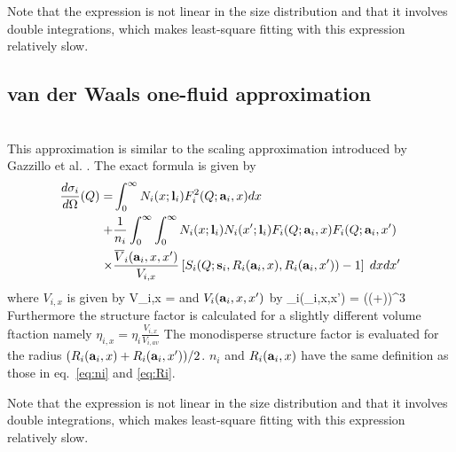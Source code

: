 Note that the expression is not linear in the size distribution
and that it involves double integrations, which makes least-square
fitting with this expression relatively slow.

\subsection{van der Waals one-fluid approximation}
\label{sec:SQvdW1}
~\\
This approximation is similar to the scaling approximation introduced by Gazzillo
et al. \cite{Gazzillo1999}. The exact formula is given by
\begin{align}
\frac{d\sigma_i}{d\Omega}(Q) =
 &\int_0^\infty N_i(x;\B{l}_i) F_i^2(Q;\B{a}_i,x) dx \\
+ & \frac{1}{n_i}\int_0^\infty\int_0^\infty
N_i(x;\B{l}_i) N_i(x';\B{l}_i) F_i(Q;\B{a}_i,x) F_i(Q;\B{a}_i,x') \nonumber \\
\times & \frac{\overline{V}_i(\B{a}_i,x,x')}{V_{i,x}}
\left[S_i(Q;\B{s}_i,R_i(\B{a}_i,x),R_i(\B{a}_i,x'))-1\right] \;dx
dx' \nonumber
\end{align}
where $V_{i,x}$ is given by
\BE
V_{i,x} = 
\EE
and $V_i(\B{a}_i,x,x')$ by
\BE
{}_i(_i,x,x') = \pi \left(\left(+\right)\right)^3
\EE
Furthermore the structure factor is calculated for a slightly different volume ftaction namely $\eta_{i,x}=\eta_i\frac{V_{i,x}}{V_{i,av}}$
The monodisperse structure factor is evaluated for the radius
$(R_i(\B{a}_i,x)+R_i(\B{a}_i,x'))/2$. $n_i$ and $R_i(\B{a}_i,x)$ have the same
definition as those in eq.\ \ref{eq:ni} and \ref{eq:Ri}.

Note that the expression is not linear in the size distribution
and that it involves double integrations, which makes least-square
fitting with this expression relatively slow.



